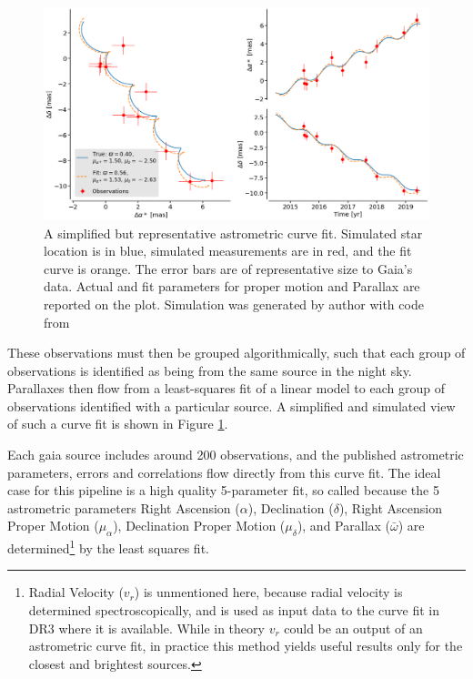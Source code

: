 \documentclass[twocolumn]{aastex631}
\begin{document}
\begin{figure}
	\includegraphics[width=\columnwidth]{astrometric-good.png}
	\caption{A simplified but representative astrometric curve fit. Simulated star location is in blue, simulated measurements are in red, and the fit curve is orange. The error bars are of representative size to Gaia's data. Actual and fit parameters for proper motion and Parallax are reported on the plot. Simulation was generated by author with code from \cite{luriGaia2018}}
	\label{fig:goodfit}
\end{figure}

These observations must then be grouped algorithmically, such that each group of observations is identified as being from the same source in the night sky. Parallaxes then flow from a least-squares fit of a linear model to each group of observations identified with a particular source. A simplified and simulated view of such a curve fit is shown in Figure \ref{fig:goodfit}. 

Each gaia source includes around 200 observations, and the published astrometric parameters, errors and correlations flow directly from this curve fit. The ideal case for this pipeline is a high quality 5-parameter fit, so called because the 5 astrometric parameters Right Ascension ($\alpha$), Declination ($\delta$), Right Ascension Proper Motion ($\mu_\alpha$), Declination Proper Motion ($\mu_\delta$), and Parallax ($\bar{\omega}$) are determined\footnote{Radial Velocity ($v_r$) is unmentioned here, because radial velocity is determined spectroscopically, and is used as input data to the curve fit in DR3 where it is available. While in theory $v_r$ could be an output of an astrometric curve fit, in practice this method yields useful results only for the closest and brightest sources\citep{lindegrenGaia2021a}.} by the least squares fit\citep{lindegrenGaia2021a}.
\end{document}
